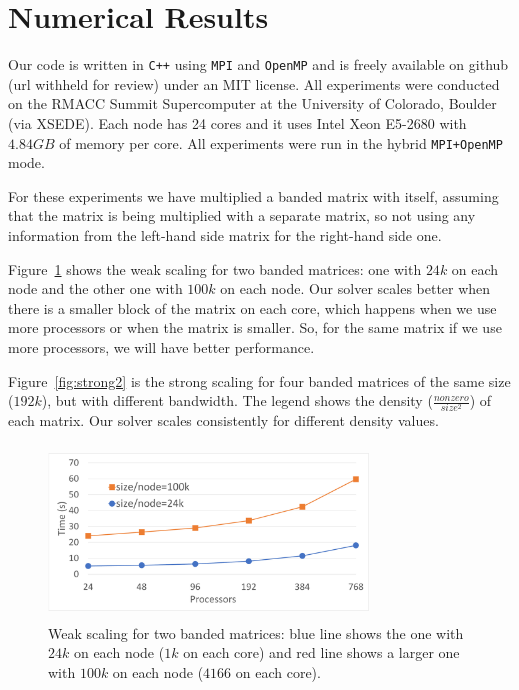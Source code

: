 \section{Numerical Results}
\label{sec:results}

Our code is written in \texttt{C++} using \texttt{MPI} and \texttt{OpenMP} and is freely available on github (url withheld for review) under an MIT license. 
All experiments were conducted on the RMACC Summit Supercomputer at the University of Colorado, Boulder (via XSEDE). Each node has 24 cores and it uses Intel Xeon E5-2680 with $4.84GB$ of memory per core. All experiments were run in the hybrid \texttt{MPI+OpenMP} mode. 

For these experiments we have multiplied a banded matrix with itself, assuming that the matrix is being multiplied with a separate matrix, so not using any information from the left-hand side matrix for the right-hand side one.

Figure~\ref{fig:weak1} shows the weak scaling for two banded matrices: one with $24k$ on each node and the other one with $100k$ on each node. Our solver scales better when there is a smaller block of the matrix on each core, which happens when we use more processors or when the matrix is smaller. So, for the same matrix if we use more processors, we will have better performance.

Figure~\ref{fig:strong2} is the strong scaling for four banded matrices of the same size ($192k$), but with different bandwidth. The legend shows the density ($\frac{nonzero}{size^2}$) of each matrix. Our solver scales consistently for different density values.

\begin{figure}[!b]
    \centering
    \includegraphics[width=8.5cm,height=4.6cm]{./figures/weak2.pdf}
    \caption{Weak scaling for two banded matrices: blue line shows the one with $24k$ on each node ($1k$ on each core) and red line shows a larger one with $100k$ on each node ($4166$ on each core).}
    \label{fig:weak1}
\end{figure}

